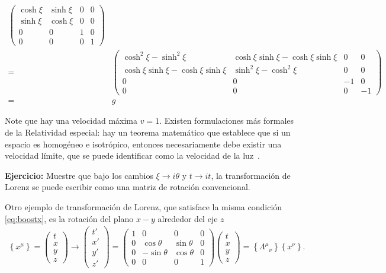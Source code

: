 \begin{frame}
\begin{align}
\begin{pmatrix}
    \cosh\xi&\sinh\xi&0&0\\
    \sinh\xi&\cosh\xi&0&0\\
    0     &  0  &1&0\\
    0     &  0  &0&1
  \end{pmatrix}\nonumber\\
  =&\begin{pmatrix}
       \cosh^2\xi-\sinh^2\xi&\cosh\xi\sinh\xi-\cosh\xi\sinh\xi&0&0\\
    \cosh\xi\sinh\xi-\cosh\xi\sinh\xi&\sinh^2\xi-\cosh^2\xi&0&0\\
    0     &  0  &-1&0\\
    0     &  0  &0&-1
  \end{pmatrix}\nonumber\\
=&g
\end{align}
\end{frame}
Note que hay una velocidad máxima $v=1$.  Existen formulaciones más formales de la Relatividad especial: hay un teorema matemático que establece que si un espacio es homogéneo e isotrópico, entonces necesariamente debe existir una velocidad límite, que se puede identificar como la velocidad de la luz~\cite{drory2016function}. 

\textbf{Ejercicio:} Muestre que bajo los cambios $\xi\to i\theta$ y $t\to it$, la transformación de Lorenz se puede escribir como una matriz de rotación convencional.

Otro ejemplo de transformación de Lorenz, que satisface la misma condición \eqref{eq:boostx}, es la rotación del plano $x-y$ alrededor del eje $z$
\begin{align}
    \left\{x^\mu\right\}=\begin{pmatrix}
    t\\
    x\\
    y\\
    z
  \end{pmatrix}\to
  \begin{pmatrix}
    t'\\
    x'\\
    y'\\
    z'
  \end{pmatrix}= 
  \begin{pmatrix}
    1     &0&0&0\\
    0     &\cos\theta&\sin\theta&0\\
    0     & -\sin\theta  &\cos\theta&0\\
    0     &  0  &0&1
  \end{pmatrix}
  \begin{pmatrix}
    t\\
    x\\
    y\\
    z
  \end{pmatrix}
=\left\{{\Lambda^\mu}_{\nu}\right\}\left\{x^\nu\right\}.
\end{align}


